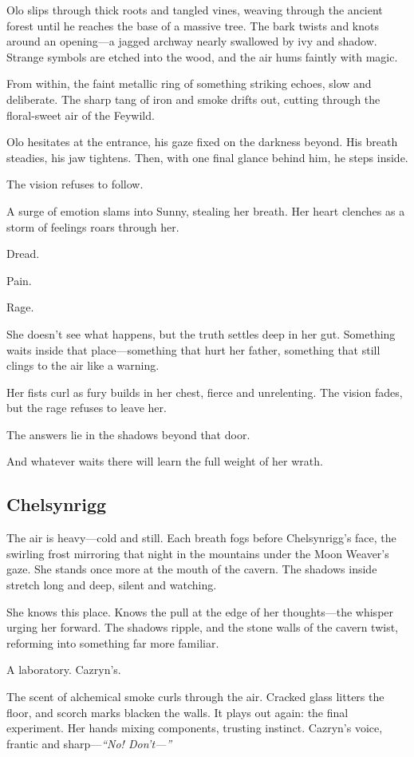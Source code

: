 \documentclass[10pt,a4paper,bg=print,twocolumn,openany,nodeprecatedcode]{dndarticle}
\begin{document}
Olo slips through thick roots and tangled vines, weaving through the ancient forest until he reaches the base of a massive tree. The bark twists and knots around an opening—a jagged archway nearly swallowed by ivy and shadow. Strange symbols are etched into the wood, and the air hums faintly with magic.

From within, the faint metallic ring of something striking echoes, slow and deliberate. The sharp tang of iron and smoke drifts out, cutting through the floral-sweet air of the Feywild.

Olo hesitates at the entrance, his gaze fixed on the darkness beyond. His breath steadies, his jaw tightens. Then, with one final glance behind him, he steps inside.

The vision refuses to follow.

A surge of emotion slams into Sunny, stealing her breath. Her heart clenches as a storm of feelings roars through her.

Dread.

Pain.

Rage.

She doesn’t see what happens, but the truth settles deep in her gut. Something waits inside that place—something that hurt her father, something that still clings to the air like a warning.

Her fists curl as fury builds in her chest, fierce and unrelenting. The vision fades, but the rage refuses to leave her.

The answers lie in the shadows beyond that door.

And whatever waits there will learn the full weight of her wrath.

\subsection*{Chelsynrigg}

The air is heavy—cold and still. Each breath fogs before Chelsynrigg’s face, the swirling frost mirroring that night in the mountains under the Moon Weaver’s gaze. She stands once more at the mouth of the cavern. The shadows inside stretch long and deep, silent and watching.

She knows this place. Knows the pull at the edge of her thoughts—the whisper urging her forward. The shadows ripple, and the stone walls of the cavern twist, reforming into something far more familiar.

A laboratory. Cazryn’s.

The scent of alchemical smoke curls through the air. Cracked glass litters the floor, and scorch marks blacken the walls. It plays out again: the final experiment. Her hands mixing components, trusting instinct. Cazryn’s voice, frantic and sharp—\textit{“No! Don’t—”}
\end{document}
